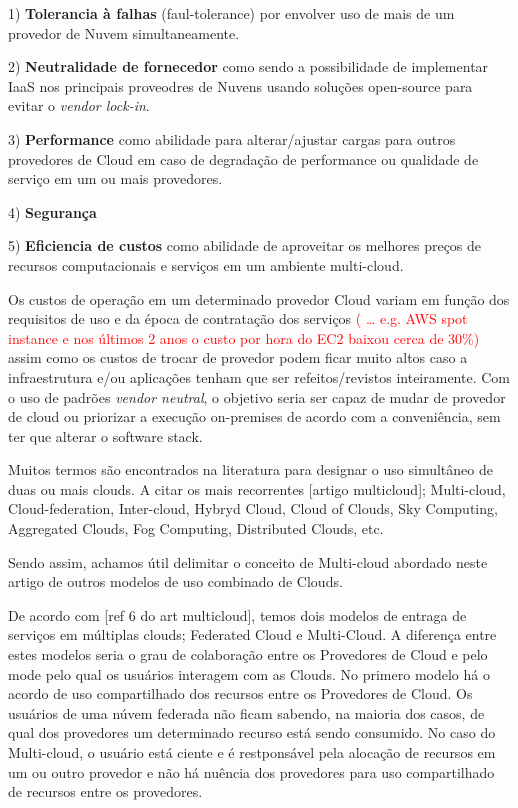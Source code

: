 \documentclass[12pt]{article}
\begin{document}
	1) \textbf{Tolerancia à falhas} (faul-tolerance) por envolver uso de mais de um provedor de Nuvem simultaneamente.
	
	2) \textbf{Neutralidade de fornecedor} como sendo a possibilidade de implementar IaaS nos principais proveodres de Nuvens usando soluções open-source para evitar o \textit{vendor lock-in}.
	
	3) \textbf{Performance} como abilidade para alterar/ajustar cargas para outros provedores de Cloud em caso de degradação de performance ou qualidade de serviço em um ou mais provedores.
	
	4) \textbf{Segurança}
	
	5) \textbf{Eficiencia de custos} como abilidade de aproveitar os melhores preços de recursos computacionais e serviços em um ambiente multi-cloud.
	
	Os custos de operação em um determinado provedor Cloud variam em função dos requisitos de uso e da época de contratação dos serviços \textcolor{red}{( … e.g. AWS spot instance e nos últimos 2 anos o custo por hora do EC2 baixou cerca de 30\%)} assim como os custos de trocar de provedor podem ficar muito altos caso a infraestrutura e/ou aplicações tenham que ser refeitos/revistos inteiramente. Com o uso de padrões \textit{vendor neutral}, o objetivo seria ser capaz de mudar de provedor de cloud ou priorizar a execução on-premises de acordo com a conveniência, sem ter que alterar o software stack.
	
	Muitos termos são encontrados na literatura para designar o uso simultâneo de duas ou mais clouds. A citar os mais recorrentes [artigo multicloud]; Multi-cloud, Cloud-federation, Inter-cloud, Hybryd Cloud, Cloud of Clouds, Sky Computing, Aggregated Clouds, Fog Computing, Distributed Clouds, etc.
	
	Sendo assim, achamos útil delimitar o conceito de Multi-cloud abordado neste artigo de outros modelos de uso combinado de Clouds.
	
	De acordo com [ref 6 do art multicloud], temos dois modelos de entraga de serviços em múltiplas clouds; Federated Cloud e Multi-Cloud. A diferença entre estes modelos seria o grau de colaboração entre os Provedores de Cloud e pelo mode pelo qual os usuários interagem com as Clouds. No primero modelo há o acordo de uso compartilhado dos recursos entre os Provedores de Cloud. Os usuários de uma núvem federada não ficam sabendo, na maioria dos casos, de qual dos provedores um determinado recurso está sendo consumido. No caso do Multi-cloud, o usuário está ciente e é restponsável pela alocação de recursos em um ou outro provedor e não há nuência dos provedores para uso compartilhado de recursos entre os provedores.
	
\end{document}
